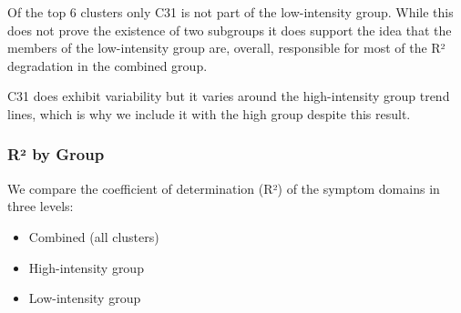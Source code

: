 \documentclass[
  letterpaper,
  DIV=11,
  numbers=noendperiod]{scrartcl}
\providecommand{\tightlist}{%
  \setlength{\itemsep}{0pt}\setlength{\parskip}{0pt}}
\begin{document}
Of the top 6 clusters only C31 is not part of the low-intensity group.
While this does not prove the existence of two subgroups it does support
the idea that the members of the low-intensity group are, overall,
responsible for most of the R² degradation in the combined group.

C31 does exhibit variability but it varies around the high-intensity
group trend lines, which is why we include it with the high group
despite this result.

\FloatBarrier 
\bigskip

\subsubsection*{R² by Group}\label{sec-r2-group}

We compare the coefficient of determination (R²) of the symptom domains
in three levels:

\begin{itemize}
\tightlist
\item
  Combined (all clusters)
\item
  High-intensity group
\item
  Low-intensity group
\end{itemize}

\FloatBarrier

\begin{table}[h]

\caption{\label{tbl-t4}R² by Domain}


\end{table}%
\end{document}
